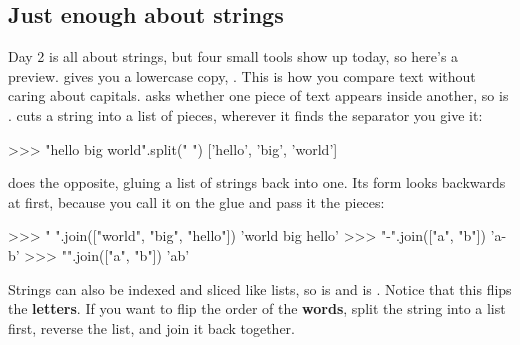 \documentclass[10pt,a4paper]{article}
\begin{document}
\subsection{Just enough about strings}
Day 2 is all about strings, but four small tools show up today, so here’s a preview.
 gives you a lowercase copy, . This is how you compare text without caring about capitals.
 asks whether one piece of text appears inside another, so  is .
 cuts a string into a list of pieces, wherever it finds the separator you give it:
\begin{txtcode}
>>> "hello big world".split(" ")
['hello', 'big', 'world']
\end{txtcode}
 does the opposite, gluing a list of strings back into one. Its form looks backwards at first, because you call it on the glue and pass it the pieces:
\begin{txtcode}
>>> " ".join(["world", "big", "hello"])
'world big hello'
>>> "-".join(["a", "b"])
'a-b'
>>> "".join(["a", "b"])
'ab'
\end{txtcode}
Strings can also be indexed and sliced like lists, so  is  and  is . Notice that this flips the \textbf{letters}. If you want to flip the order of the \textbf{words}, split the string into a list first, reverse the list, and join it back together.
\end{document}
